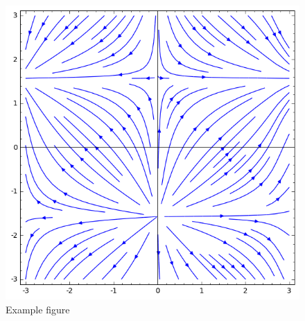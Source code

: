 \documentclass{article}
\numberwithin{equation}{section}
\begin{document}
  \begin{figure}[h!]
  \begin{center}

    \includegraphics[scale=.75]{plot_5}
    \caption{Example figure}

    \label{fig:atom}
  \end{center}
  \end{figure}

\end{document}
